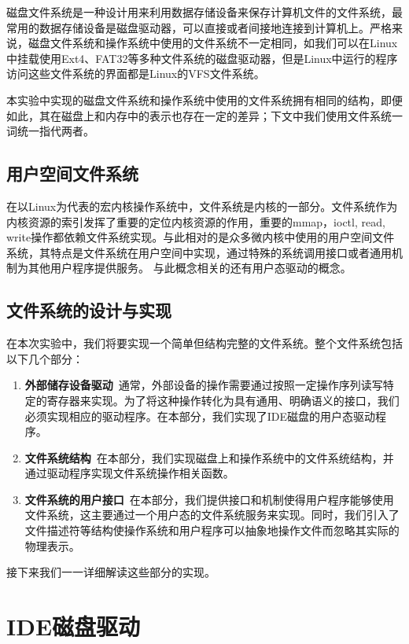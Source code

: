 磁盘文件系统是一种设计用来利用数据存储设备来保存计算机文件的文件系统，最常用的数据存储设备是磁盘驱动器，可以直接或者间接地连接到计算机上。严格来说，磁盘文件系统和操作系统中使用的文件系统不一定相同，如我们可以在Linux中挂载使用Ext4、FAT32等多种文件系统的磁盘驱动器，但是Linux中运行的程序访问这些文件系统的界面都是Linux的VFS文件系统。

本实验中实现的磁盘文件系统和操作系统中使用的文件系统拥有相同的结构，即便如此，其在磁盘上和内存中的表示也存在一定的差异；下文中我们使用文件系统一词统一指代两者。

\subsection{用户空间文件系统}

在以Linux为代表的宏内核操作系统中，文件系统是内核的一部分。文件系统作为内核资源的索引发挥了重要的定位内核资源的作用，重要的mmap，ioctl, read, write操作都依赖文件系统实现。与此相对的是众多微内核中使用的用户空间文件系统，其特点是文件系统在用户空间中实现，通过特殊的系统调用接口或者通用机制为其他用户程序提供服务。
与此概念相关的还有用户态驱动的概念。


\subsection{文件系统的设计与实现}

在本次实验中，我们将要实现一个简单但结构完整的文件系统。整个文件系统包括以下几个部分：

\begin{enumerate}
	\item \textbf{外部储存设备驱动}~通常，外部设备的操作需要通过按照一定操作序列读写特定的寄存器来实现。为了将这种操作转化为具有通用、明确语义的接口，我们必须实现相应的驱动程序。在本部分，我们实现了IDE磁盘的用户态驱动程序。
	\item \textbf{文件系统结构}~在本部分，我们实现磁盘上和操作系统中的文件系统结构，并通过驱动程序实现文件系统操作相关函数。
	\item \textbf{文件系统的用户接口}~在本部分，我们提供接口和机制使得用户程序能够使用文件系统，这主要通过一个用户态的文件系统服务来实现。同时，我们引入了文件描述符等结构使操作系统和用户程序可以抽象地操作文件而忽略其实际的物理表示。
\end{enumerate}

接下来我们一一详细解读这些部分的实现。

\section{IDE磁盘驱动}

